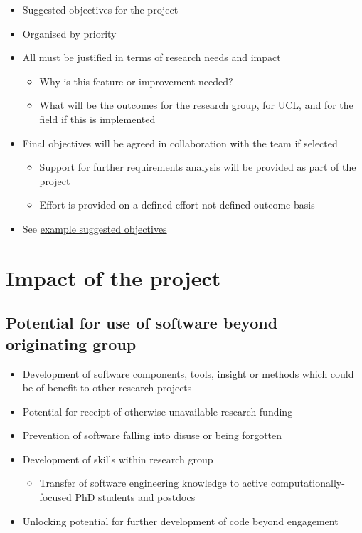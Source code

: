 \documentclass[]{scrartcl}
\begin{document}
\begin{itemize}
\itemsep1pt\parskip0pt
\item
  Suggested objectives for the project
\item
  Organised by priority
\item
  All must be justified in terms of research needs and impact

  \begin{itemize}
  \itemsep1pt\parskip0pt
  \item
    Why is this feature or improvement needed?
  \item
    What will be the outcomes for the research group, for UCL, and for
    the field if this is implemented
  \end{itemize}
\item
  Final objectives will be agreed in collaboration with the team if
  selected

  \begin{itemize}
  \itemsep1pt\parskip0pt
  \item
    Support for further requirements analysis will be provided as part
    of the project
  \item
    Effort is provided on a defined-effort not defined-outcome basis
  \end{itemize}
\item
  See
  \href{http://development.rc.ucl.ac.uk/termly-call/examples.html}{example
  suggested objectives}
\end{itemize}

\section{Impact of the project}\label{impact-of-the-project}

\subsection{Potential for use of software beyond originating
group}\label{potential-for-use-of-software-beyond-originating-group}

\begin{itemize}
\itemsep1pt\parskip0pt
\item
  Development of software components, tools, insight or methods which
  could be of benefit to other research projects
\item
  Potential for receipt of otherwise unavailable research funding
\item
  Prevention of software falling into disuse or being forgotten
\item
  Development of skills within research group

  \begin{itemize}
  \itemsep1pt\parskip0pt
  \item
    Transfer of software engineering knowledge to active
    computationally-focused PhD students and postdocs
  \end{itemize}
\item
  Unlocking potential for further development of code beyond engagement
\end{itemize}
\end{document}
